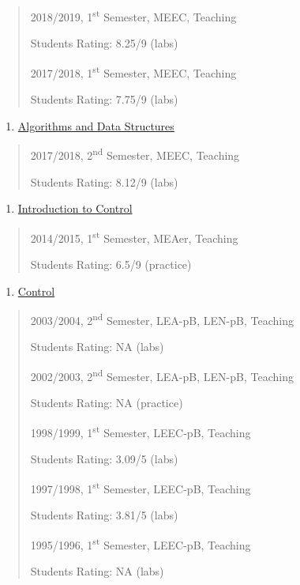 \begin{quote}
2018/2019, 1\textsuperscript{st} Semester, MEEC, Teaching

Students Rating: 8.25/9 (labs)

2017/2018, 1\textsuperscript{st} Semester, MEEC, Teaching

Students Rating: 7.75/9 (labs)
\end{quote}

\begin{enumerate}
\def\labelenumi{\arabic{enumi}.}
\setcounter{enumi}{15}
\item
  \ul{Algorithms and Data Structures}
\end{enumerate}

\begin{quote}
2017/2018, 2\textsuperscript{nd} Semester, MEEC, Teaching

Students Rating: 8.12/9 (labs)
\end{quote}

\begin{enumerate}
\def\labelenumi{\arabic{enumi}.}
\setcounter{enumi}{16}
\item
  \ul{Introduction to Control}
\end{enumerate}

\begin{quote}
2014/2015, 1\textsuperscript{st} Semester, MEAer, Teaching

Students Rating: 6.5/9 (practice)
\end{quote}

\begin{enumerate}
\def\labelenumi{\arabic{enumi}.}
\setcounter{enumi}{17}
\item
  \ul{Control}
\end{enumerate}

\begin{quote}
2003/2004, 2\textsuperscript{nd} Semester, LEA-pB, LEN-pB, Teaching

Students Rating: NA (labs)

2002/2003, 2\textsuperscript{nd} Semester, LEA-pB, LEN-pB, Teaching

Students Rating: NA (practice)

1998/1999, 1\textsuperscript{st} Semester, LEEC-pB, Teaching

Students Rating: 3.09/5 (labs)

1997/1998, 1\textsuperscript{st} Semester, LEEC-pB, Teaching

Students Rating: 3.81/5 (labs)

1995/1996, 1\textsuperscript{st} Semester, LEEC-pB, Teaching

Students Rating: NA (labs)
\end{quote}

